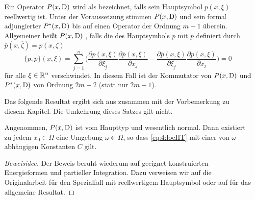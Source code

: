 Ein Operator $P(x,\mathrm D)$ wird als   bezeichnet, falls sein Hauptsymbol $p(x,\xi)$ reellwertig ist. Unter der Voraussetzung stimmen $P(x,\mathrm D)$ und sein formal adjungierter $P^*(x,\mathrm D)$ bis auf einen Operator der Ordnung $m-1$ überein. Allgemeiner heißt $P(x,\mathrm D)$ , falls die   des Hauptsymbols $p$ mit $\overline p$ definiert durch $\overline p(x, \overline\zeta) = \overline{p(x,\zeta)}$
\begin{equation}
    \{ p,\overline p\} (x,\xi) = \sum_{j=1}^n \bigg(\frac{\partial p(x,\xi)}{\partial \xi_j} \frac{\partial \overline p (x,\xi)}{\partial x_j} - \frac{\partial \overline p(x,\xi)}{\partial \xi_j}\frac{\partial  p(x,\xi)}{\partial x_j} \bigg)    = 0 
\end{equation}
für alle $\xi\in\mathbb R^n$ verschwindet. In diesem Fall ist der Kommutator von $P(x,\mathrm D)$ und $P^*(x,\mathrm D)$ von Ordnung $2m-2$ (statt nur $2m-1$).

Das folgende Resultat ergibt sich aus \cite[Theorem~4.1]{Hormander:1955} zusammen mit der Vorbemerkung zu diesem Kapitel. Die Umkehrung dieses Satzes gilt nicht.

\begin{thm}\label{thm:4:4.2}
Angenommen, $P(x,\mathrm D)$ ist vom Haupttyp und wesentlich normal. Dann existiert zu jedem $x_0\in\Omega$ eine Umgebung $\omega\Subset\Omega$, so dass
\eqref{eq:4:locHT} mit einer von $\omega$ abhängigen Konstanten $C$ gilt.
\end{thm}
\begin{proof}[Beweisidee]
Der Beweis beruht wiederum auf geeignet konstruierten Energieformen und partieller Integration. Dazu verweisen wir auf die Originalarbeit \cite[Section 4.2]{Hormander:1955} für den Spezialfall mit reellwertigem Hauptsymbol oder auf \cite[Section 8.5]{Hormander:1963} für das allgemeine Resultat.
\end{proof}

